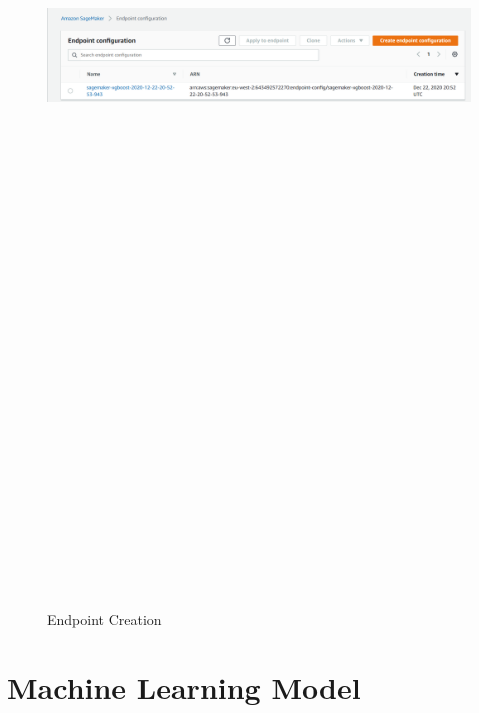 \begin{figure} [ht]
    \centering
    \includegraphics[width=14.6cm,height=200.0cm,keepaspectratio]{pages/Chapter4/Chapter 4 Images/Endpoint.PNG}
    \caption{Endpoint Creation}
    \label{fig_endpoint}
\end{figure}

\section{Machine Learning Model}
  
